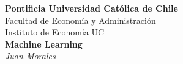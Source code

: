 \documentclass[12pt, a4paper]{report}
\begin{document}
\begin{titlepage}
\centering

\vspace*{1cm}

{\Large \textbf{Pontificia Universidad Católica de Chile}}\\[0.5cm]
{\large Facultad de Economía y Administración}\\[0.3cm]
{\large Instituto de Economía UC}\\[1cm]

{\LARGE \textbf{Machine Learning}}\\[1cm]

{\large \textit{Juan Morales}}\\

\vfill

\end{titlepage}
\tableofcontents
\newpage
\end{document}
